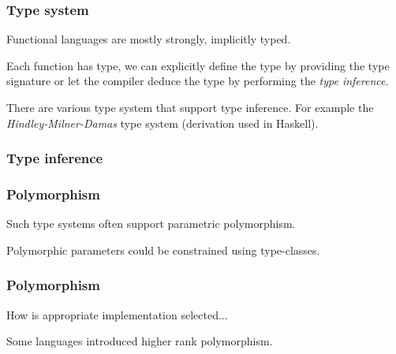 \documentclass{beamer}
\newcommand{\vpad}{\vspace{5pt}}
\begin{document}

\begin{frame} \frametitle{Type system}
  Functional languages are mostly strongly, implicitly typed.

  \vpad
  Each function has type, we can explicitly define the type by providing the
  type signature or let the compiler deduce the type by performing the
  \textit{type inference}.
  \fplus

  There are various type system that support type inference. For example
  the \textit{Hindley-Milner-Damas} type system (derivation used in Haskell).

\end{frame}

\begin{frame} \frametitle{Type inference}

\end{frame}




\begin{frame} \frametitle{Polymorphism}
  Such type systems often support parametric polymorphism.
  \begin{block}{}
    \fpolylist
  \end{block}

  Polymorphic parameters could be constrained using type-classes.
  \begin{block}{}
    \fpolyfold
  \end{block}
\end{frame}

\begin{frame} \frametitle{Polymorphism}
  How is appropriate implementation selected...

  Some languages introduced higher rank polymorphism.
  \begin{block}{}
    \fpolyrankn
  \end{block}
\end{frame}
\end{document}
